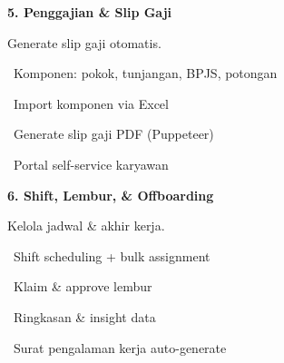 \documentclass[a4paper]{article}
\begin{document}
\noindent
\begin{minipage}[t]{0.485\textwidth}
    \colorbox{OrangePrimary}{%
        \begin{minipage}{\dimexpr\textwidth-2\fboxsep\relax}
            {\fontsize{10}{13}\selectfont\bfseries\color{White} 5. Penggajian \& Slip Gaji}
        \end{minipage}}\par
    \vspace{4pt}
    {\fontsize{9}{12}\selectfont\color{TextDark}%
    Generate slip gaji otomatis.\par\vspace{3pt}
    \textbullet\ Komponen: pokok, tunjangan, BPJS, potongan\par\vspace{2pt}%
    \textbullet\ Import komponen via Excel\par\vspace{2pt}%
    \textbullet\ Generate slip gaji PDF (Puppeteer)\par\vspace{2pt}%
    \textbullet\ Portal self-service karyawan}%

\end{minipage}%
\hfill
\begin{minipage}[t]{0.485\textwidth}
    \colorbox{EmeraldDark}{%
        \begin{minipage}{\dimexpr\textwidth-2\fboxsep\relax}
            {\fontsize{10}{13}\selectfont\bfseries\color{White} 6. Shift, Lembur, \& Offboarding}
        \end{minipage}}\par
    \vspace{4pt}
    {\fontsize{9}{12}\selectfont\color{TextDark}%
    Kelola jadwal \& akhir kerja.\par\vspace{3pt}
    \textbullet\ Shift scheduling + bulk assignment\par\vspace{2pt}%
    \textbullet\ Klaim \& approve lembur\par\vspace{2pt}%
    \textbullet\ Ringkasan \& insight data\par\vspace{2pt}%
    \textbullet\ Surat pengalaman kerja auto-generate}%

\end{minipage}

\vspace{8pt}
\end{document}
